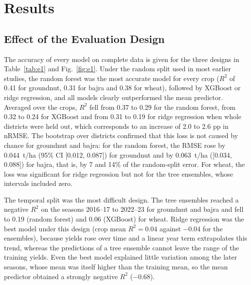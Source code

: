\section{Results}\label{sec:results}

\subsection{Effect of the Evaluation Design}

The accuracy of every model on complete data is given for the three designs in
Table~\ref{tab:e1} and Fig.~\ref{fig:e1}. Under the random split used in most earlier studies,
the random forest was the most accurate model for every crop ($R^2$ of 0.41 for groundnut, 0.31
for bajra and 0.38 for wheat), followed by XGBoost or ridge regression, and all models clearly
outperformed the mean predictor. Averaged over the crops, $R^2$ fell from 0.37 to 0.29 for the
random forest, from 0.32 to 0.24 for XGBoost and from 0.31 to 0.19 for ridge regression when
whole districts were held out, which corresponds to an increase of 2.0 to 2.6 pp in nRMSE. The
bootstrap over districts confirmed that this loss is not caused by chance for groundnut and bajra:
for the random forest, the RMSE rose by 0.044~t/ha (95\% CI [0.012, 0.087]) for groundnut and by
0.063~t/ha ([0.034, 0.088]) for bajra, that is, by 7 and 14\% of the random-split error. For
wheat, the loss was significant for ridge regression but not for the tree ensembles, whose
intervals included zero.

The temporal split was the most difficult design. The tree ensembles reached a negative $R^2$ on
the seasons 2016--17 to 2022--23 for groundnut and bajra and fell to 0.19 (random forest) and
0.06 (XGBoost) for wheat. Ridge regression was the best model under this design (crop mean
$R^2 = 0.04$ against $-0.04$ for the ensembles), because yields rose over time and a linear year
term extrapolates this trend, whereas the predictions of a tree ensemble cannot leave the range
of the training yields. Even the best model explained little variation among the later seasons,
whose mean was itself higher than the training mean, so the mean predictor obtained a strongly
negative $R^2$ ($-0.68$).

\begin{table}[!t]
\caption{Accuracy on Complete Data Under the Three Evaluation Designs (RMSE in t/ha, Mean of
Three Seeds)}\label{tab:e1}
\centering\footnotesize\setlength{\tabcolsep}{4pt}

\end{table}

